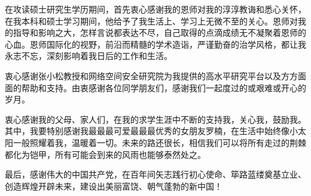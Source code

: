 在攻读硕士研究生学历期间，首先衷心感谢我的恩师对我的淳淳教诲和悉心关怀，在我本科和硕士学习期间，他给予了我生活上、学习上无微不至的关心。恩师对我的指导和影响之大，怎样言说都表达不尽，自己取得的点滴成绩无不凝聚着恩师的心血。恩师国际化的视野，前沿而精髓的学术造诣，严谨勤奋的治学风格，都让我永志不忘，深刻影响着我日后的工作和生活。

衷心感谢张小松教授和网络空间安全研究院为我提供的高水平研究平台以及方方面面的帮助和支持。由衷感谢各位同学朋友们，感谢我们一起度过的或艰难或开心的岁月。

衷心感谢我的父母、家人们，在我的求学生涯中不断的支持我，关心我，鼓励我。其中，我要特别感谢我最最最可爱最最最优秀的女朋友罗楠，在生活中始终像小太阳一般照耀着我，温暖着一切。未来的路还很长，相信我们可以将所有走过的荆棘都化为铠甲，所有可能会到来的风雨也能够泰然处之。

最后，感谢伟大的中国共产党，在百年间矢志践行初心使命、筚路蓝缕奠基立业、创造辉煌开辟未来，建设出美丽富饶、朝气蓬勃的新中国！